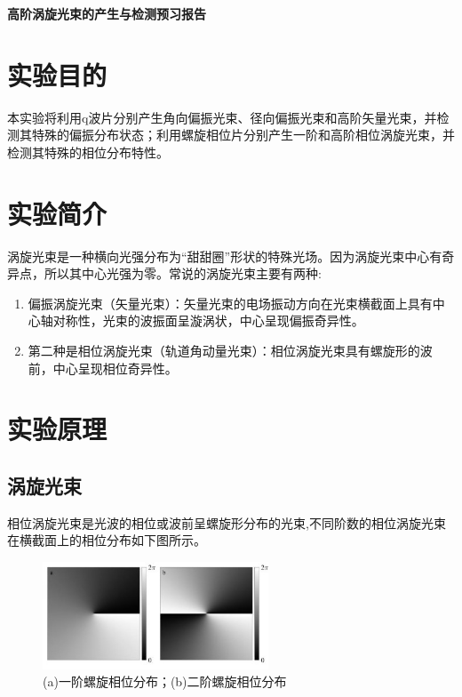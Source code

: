 \documentclass[a4paper,UTF8]{ctexart}
\begin{document}
\begin{center}
    \textbf{\Large 高阶涡旋光束的产生与检测预习报告}
    \par {}
\end{center}

\section{实验目的}

本实验将利用q波片分别产生角向偏振光束、径向偏振光束和高阶矢量光束，并检测其特殊的偏振分布状态；利用螺旋相位片分别产生一阶和高阶相位涡旋光束，并检测其特殊的相位分布特性。

\section{实验简介}

涡旋光束是一种横向光强分布为“甜甜圈”形状的特殊光场。因为涡旋光束中心有奇异点，所以其中心光强为零。常说的涡旋光束主要有两种:

\begin{enumerate}
    \item 偏振涡旋光束（矢量光束）：矢量光束的电场振动方向在光束横截面上具有中心轴对称性，光束的波振面呈漩涡状，中心呈现偏振奇异性。
    \item 第二种是相位涡旋光束（轨道角动量光束）：相位涡旋光束具有螺旋形的波前，中心呈现相位奇异性。
\end{enumerate}

\section{实验原理}

\subsection{涡旋光束}

相位涡旋光束是光波的相位或波前呈螺旋形分布的光束,不同阶数的相位涡旋光束在横截面上的相位分布如下图所示。

\begin{figure}[H]
    \centering
    \begin{minipage}[b]{0.9\textwidth}
        \centering
        \includegraphics[width=0.6\textwidth]{./fig2.jpg}
        \caption{(a)一阶螺旋相位分布；(b)二阶螺旋相位分布}
    \end{minipage}
\end{figure}
\end{document}
